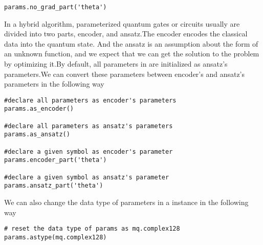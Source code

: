 \begin{lstlisting}
params.no_grad_part('theta')
\end{lstlisting}

In a hybrid algorithm, parameterized quantum gates or circuits usually are divided into two parts, encoder, and ansatz.The encoder encodes the classical data into the quantum state. And the ansatz is an assumption about the form of an unknown function, and we expect that we can get the solution to the problem by optimizing it.By default, all parameters in \ParameterResolver are initialized as ansatz's parameters.We can convert these parameters between encoder's and ansatz's parameters in the following way

\begin{lstlisting}
#declare all parameters as encoder's parameters
params.as_encoder()

#declare all parameters as ansatz's parameters
params.as_ansatz()

#declare a given symbol as encoder's parameter
params.encoder_part('theta')

#declare a given symbol as ansatz's parameter
params.ansatz_part('theta')
\end{lstlisting}

We can also change the data type of parameters in a \ParameterResolver instance in the following way
\begin{lstlisting}
# reset the data type of params as mq.complex128
params.astype(mq.complex128)
\end{lstlisting}
